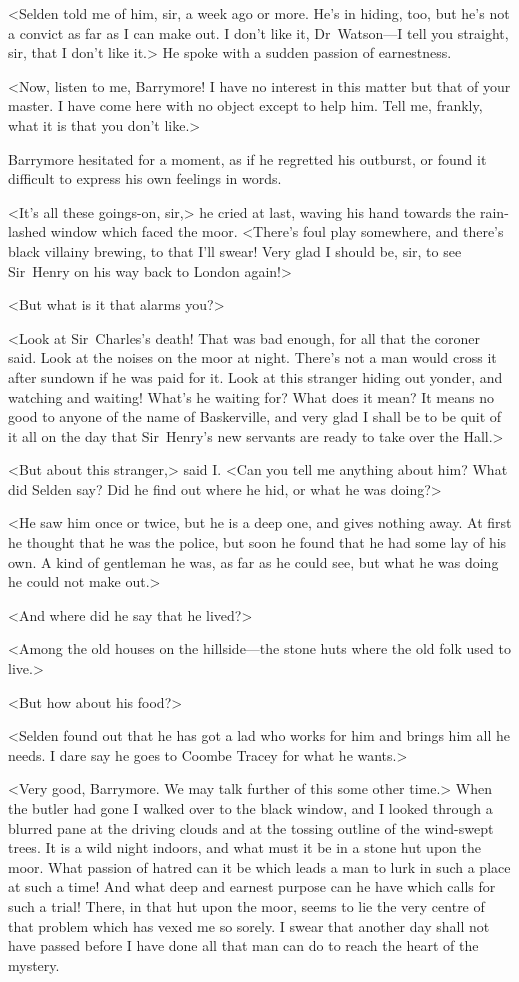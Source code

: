 <Selden told me of him, sir, a week ago or more. He's in hiding, too, but he's not a convict as far as I can make out. I don't like it, Dr~Watson—I tell you straight, sir, that I don't like it.> He spoke with a sudden passion of earnestness.

<Now, listen to me, Barrymore! I have no interest in this matter but that of your master. I have come here with no object except to help him. Tell me, frankly, what it is that you don't like.>

Barrymore hesitated for a moment, as if he regretted his outburst, or found it difficult to express his own feelings in words.

<It's all these goings-on, sir,> he cried at last, waving his hand towards the rain-lashed window which faced the moor. <There's foul play somewhere, and there's black villainy brewing, to that I'll swear! Very glad I should be, sir, to see Sir~Henry on his way back to London again!>

<But what is it that alarms you?>

<Look at Sir~Charles's death! That was bad enough, for all that the coroner said. Look at the noises on the moor at night. There's not a man would cross it after sundown if he was paid for it. Look at this stranger hiding out yonder, and watching and waiting! What's he waiting for? What does it mean? It means no good to anyone of the name of Baskerville, and very glad I shall be to be quit of it all on the day that Sir~Henry's new servants are ready to take over the Hall.>

<But about this stranger,> said I\@. <Can you tell me anything about him? What did Selden say? Did he find out where he hid, or what he was doing?>

<He saw him once or twice, but he is a deep one, and gives nothing away. At first he thought that he was the police, but soon he found that he had some lay of his own. A kind of gentleman he was, as far as he could see, but what he was doing he could not make out.>

<And where did he say that he lived?>

<Among the old houses on the hillside—the stone huts where the old folk used to live.>

<But how about his food?>

<Selden found out that he has got a lad who works for him and brings him all he needs. I dare say he goes to Coombe Tracey for what he wants.>

<Very good, Barrymore. We may talk further of this some other time.> When the butler had gone I walked over to the black window, and I looked through a blurred pane at the driving clouds and at the tossing outline of the wind-swept trees. It is a wild night indoors, and what must it be in a stone hut upon the moor. What passion of hatred can it be which leads a man to lurk in such a place at such a time! And what deep and earnest purpose can he have which calls for such a trial! There, in that hut upon the moor, seems to lie the very centre of that problem which has vexed me so sorely. I swear that another day shall not have passed before I have done all that man can do to reach the heart of the mystery.
